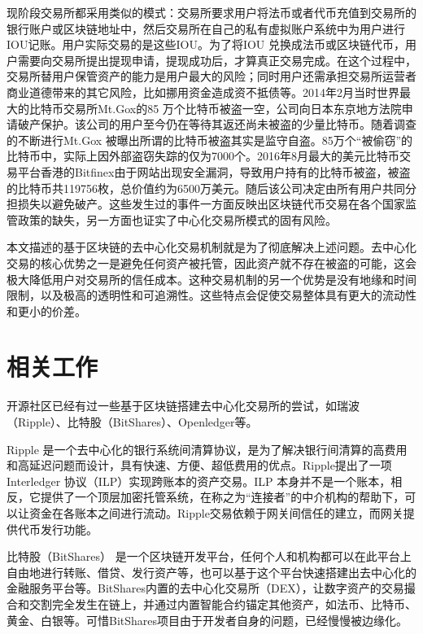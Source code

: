 \documentclass[UTF8,nofonts]{ctexart}
\begin{document}
现阶段交易所都采用类似的模式：交易所要求用户将法币或者代币充值到交易所的银行账户或区块链地址中，然后交易所在自己的私有虚拟账户系统中为用户进行IOU记账。用户实际交易的是这些IOU。为了将IOU 兑换成法币或区块链代币，用户需要向交易所提出提现申请，提现成功后，才算真正交易完成。在这个过程中，交易所替用户保管资产的能力是用户最大的风险；同时用户还需承担交易所运营者商业道德带来的其它风险，比如挪用资金造成资不抵债等。2014年2月当时世界最大的比特币交易所Mt.Gox的85 万个比特币被盗一空\cite{mcmillan2014inside}，公司向日本东京地方法院申请破产保护。该公司的用户至今仍在等待其返还尚未被盗的少量比特币。随着调查的不断进行Mt.Gox 被曝出所谓的比特币被盗其实是监守自盗。85万个“被偷窃”的比特币中，实际上因外部盗窃失踪的仅为7000个。2016年8月最大的美元比特币交易平台香港的Bitfinex由于网站出现安全漏洞，导致用户持有的比特币被盗，被盗的比特币共119756枚，总价值约为6500万美元。随后该公司决定由所有用户共同分担损失以避免破产。这些发生过的事件一方面反映出区块链代币交易在各个国家监管政策的缺失，另一方面也证实了中心化交易所模式的固有风险。

本文描述的基于区块链的去中心化交易机制就是为了彻底解决上述问题。去中心化交易的核心优势之一是避免任何资产被托管，因此资产就不存在被盗的可能，这会极大降低用户对交易所的信任成本。这种交易机制的另一个优势是没有地缘和时间限制，以及极高的透明性和可追溯性。这些特点会促使交易整体具有更大的流动性和更小的价差。

\section{相关工作\label{sec:existingworks}}

开源社区已经有过一些基于区块链搭建去中心化交易所的尝试，如瑞波（Ripple）、比特股（BitShares）、Openledger等。

Ripple \cite{schwartz2014ripple} 是一个去中心化的银行系统间清算协议，是为了解决银行间清算的高费用和高延迟问题而设计，具有快速、方便、超低费用的优点。Ripple提出了一项Interledger \cite{thomas2015protocol} 协议（ILP）实现跨账本的资产交易。ILP 本身并不是一个账本，相反，它提供了一个顶层加密托管系统，在称之为“连接者”的中介机构的帮助下，可以让资金在各账本之间进行流动。Ripple交易依赖于网关间信任的建立，而网关提供代币发行功能。

比特股（BitShares） \cite{schuhbitshares}\cite{schuh2015bitshares}  是一个区块链开发平台，任何个人和机构都可以在此平台上自由地进行转账、借贷、发行资产等，也可以基于这个平台快速搭建出去中心化的金融服务平台等。BitShares内置的去中心化交易所（DEX），让数字资产的交易撮合和交割完全发生在链上，并通过内置智能合约锚定其他资产，如法币、比特币、黄金、白银等。可惜BitShares项目由于开发者自身的问题，已经慢慢被边缘化。
\end{document}
